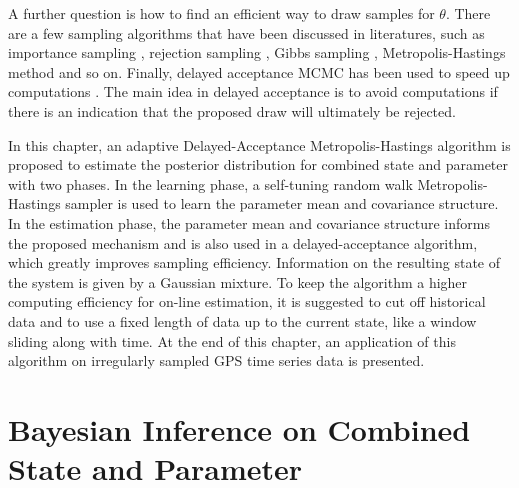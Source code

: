 A further question is how to find an efficient way to draw samples for $\theta$. There are a few sampling algorithms that have been discussed in literatures, such as importance sampling \citep{hammersley1964percolation, geweke1989bayesian}, rejection sampling \citep{casella2004generalized, martino2010generalized}, Gibbs sampling \citep{geman1984stochastic}, Metropolis-Hastings method \citep{metropolis1953equation, hastings1970monte} and so on. Finally, delayed acceptance MCMC has been used to speed up
computations \citep{payne2018two, quiroz2018speeding}. The main idea in delayed acceptance is to avoid computations if there is an indication that the proposed draw will ultimately be rejected.


In this chapter, an adaptive Delayed-Acceptance Metropolis-Hastings algorithm is proposed to estimate the posterior distribution for combined state and parameter with two phases. In the learning phase, a self-tuning random walk Metropolis-Hastings sampler is used to learn the parameter mean and covariance structure. In the estimation phase, the parameter mean and covariance structure informs the proposed mechanism and is also used in a delayed-acceptance algorithm, which greatly improves sampling efficiency. Information on the resulting state of the system is given by a Gaussian mixture. To keep the algorithm a higher computing efficiency for on-line estimation, it is suggested to cut off historical data and to use a fixed length of data up to the current state, like a window sliding along with time. At the end of this chapter, an application of this algorithm on irregularly sampled GPS time series data is presented. 

%



\section{Bayesian Inference on Combined State and Parameter}



